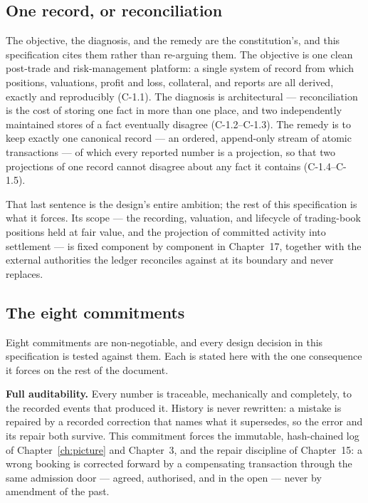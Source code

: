 \documentclass[11pt,a4paper]{article}
\begin{document}
\subsection{One record, or reconciliation}

The objective, the diagnosis, and the remedy are the constitution's, and this
specification cites them rather than re-arguing them. The objective is one clean
post-trade and risk-management platform: a single system of record from which
positions, valuations, profit and loss, collateral, and reports are all derived,
exactly and reproducibly (C-1.1). The diagnosis is architectural --- reconciliation is
the cost of storing one fact in more than one place, and two independently maintained
stores of a fact eventually disagree (C-1.2--C-1.3). The remedy is to keep exactly one
canonical record --- an ordered, append-only stream of atomic transactions --- of which
every reported number is a projection, so that two projections of one record cannot
disagree about any fact it contains (C-1.4--C-1.5).

That last sentence is the design's entire ambition; the rest of this specification is
what it forces. Its scope --- the recording, valuation, and lifecycle of trading-book
positions held at fair value, and the projection of committed activity into settlement
--- is fixed component by component in Chapter~17, together with the external
authorities the ledger reconciles against at its boundary and never replaces.

\subsection{The eight commitments}

Eight commitments are non-negotiable, and every design decision in this specification is
tested against them. Each is stated here with the one consequence it forces on the
rest of the document.

\textbf{Full auditability.} Every number is traceable, mechanically and completely, to
the recorded events that produced it. History is never rewritten: a mistake is
repaired by a recorded correction that names what it supersedes, so the error and its
repair both survive. This commitment forces the immutable, hash-chained log of
Chapter~\ref{ch:picture} and Chapter~3, and the repair discipline of Chapter~15: a
wrong booking is corrected forward by a compensating transaction through the same admission
door --- agreed, authorised, and in the open --- never by amendment of the past.
\end{document}
